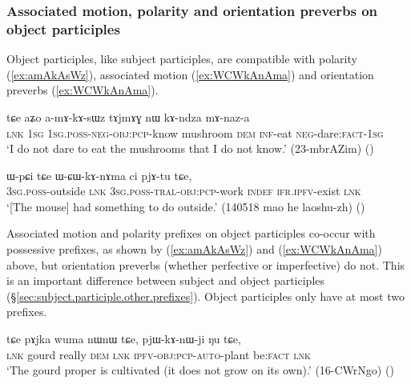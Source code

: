 \subsubsection{Associated motion, polarity and orientation preverbs on object participles}  \label{sec:object.participle.other.prefixes}
Object participles, like subject participles, are compatible with polarity (\ref{ex:amAkAsWz}), associated motion (\ref{ex:WCWkAnAma}) and orientation preverbs (\ref{ex:WCWkAnAma}).

\begin{exe}
\ex  \label{ex:amAkAsWz}
\gll tɕe aʑo a-mɤ-kɤ-sɯz tɤjmɤɣ nɯ kɤ-ndza mɤ-naz-a \\
\textsc{lnk} \textsc{1sg} \textsc{1sg}.\textsc{poss}-\textsc{neg}-\textsc{obj}:\textsc{pcp}-know mushroom \textsc{dem} \textsc{inf}-eat \textsc{neg}-dare:\textsc{fact}-\textsc{1sg}  \\
\glt `I do not dare to eat the mushrooms that I do not know.' (23-mbrAZim)
()
\end{exe}

\begin{exe}
\ex  \label{ex:WCWkAnAma}
\gll ɯ-pɕi tɕe ɯ-ɕɯ-kɤ-nɤma ci pjɤ-tu tɕe, \\
\textsc{3sg}.\textsc{poss}-outside \textsc{lnk} \textsc{3sg}.\textsc{poss}-\textsc{tral}-\textsc{obj}:\textsc{pcp}-work \textsc{indef} \textsc{ifr}.\textsc{ipfv}-exist \textsc{lnk} \\
\glt  `[The mouse] had something to do outside.' (140518 mao he laoshu-zh)
()
\end{exe}

Associated motion and polarity prefixes on object participles co-occur with possessive prefixes, as shown by  (\ref{ex:amAkAsWz}) and  (\ref{ex:WCWkAnAma})  above, but orientation preverbs (whether perfective or imperfective) do not. This is an important difference between subject and object participles (§\ref{sec:subject.participle.other.prefixes}). Object participles only have at most two prefixes.

\begin{exe}
\ex  \label{ex:pjWKAnWji}
\gll tɕe pɤjka wuma nɯnɯ tɕe, pjɯ-kɤ-nɯ-ji ŋu tɕe, \\
\textsc{lnk} gourd really \textsc{dem} \textsc{lnk} \textsc{ipfv}-\textsc{obj}:\textsc{pcp}-\textsc{auto}-plant be:\textsc{fact} \textsc{lnk} \\
\glt `The gourd proper is cultivated (it does not grow on its own).' (16-CWrNgo) ()
\end{exe}

